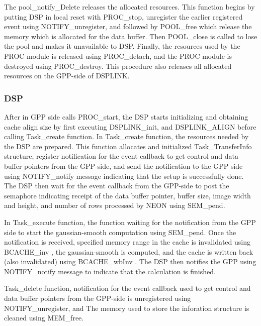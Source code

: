 \documentclass[conference]{IEEEtran}
\begin{document}
The pool\_notify\_Delete releases the allocated resources. This function begins by putting DSP in local reset with PROC\_stop, unregister the earlier registered event using NOTIFY\_unregister, and followed by POOL\_free which release the memory which is allocated for the data buffer. Then POOL\_close is called to lose the pool and makes it unavailable to DSP. Finally, the resources used by the PROC module is released using PROC\_detach, and the PROC module is destroyed using PROC\_destroy. This procedure also releases all allocated resources on the GPP-side of DSPLINK.

\subsubsection{DSP}
After in GPP side calls PROC\_start, the DSP starts initializing and obtaining cache align size by first executing DSPLINK\_init, and DSPLINK\_ALIGN before calling Task\_create function. In Task\_create function, the resources needed by the DSP are prepared. This function allocates and initialized Task\_TransferInfo structure, register notification for the event callback to get control and data buffer pointers from the GPP-side, and send the notification to the GPP side using NOTIFY\_notify message indicating that the setup is successfully done. The DSP then wait for the event callback from the GPP-side to post the semaphore indicating receipt of the data buffer pointer, buffer size, image width and height, and number of rows processed by NEON using SEM\_pend.

In Task\_execute function, the function waiting for the notification from the GPP side to start the gaussian-smooth computation using SEM\_pend. Once the notification is received, specified memory range in the cache is invalidated using BCACHE\_inv \cite{paper3}, the gaussian-smooth is computed, and the cache is written back (also invalidated) using BCACHE\_wbInv \cite{paper3}. The DSP then notifies the GPP using NOTIFY\_notify message to indicate that the calculation is finished.

Task\_delete function, notification for the event callback used to get control and data buffer pointers from the GPP-side is unregistered using NOTIFY\_unregister, and The memory used to store the inforation structure is cleaned using MEM\_free.

   
\end{document}
